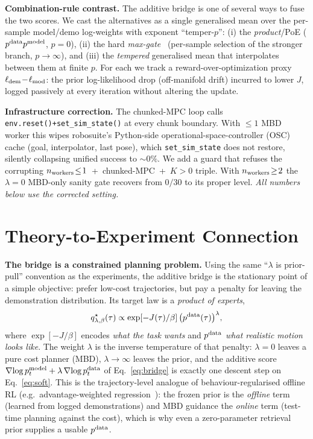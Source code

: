 \documentclass[letterpaper, 10 pt, conference]{ieeeconf}
\begin{document}
\textbf{Combination-rule contrast.} The additive bridge is one of several
ways to fuse the two scores. We cast the alternatives as a single
generalised mean over the per-sample model/demo log-weights with exponent
``temper-$p$'': (i) the \emph{product}/PoE
($p^{\rm data}p^{\rm model}$, $p\!=\!0$), (ii) the hard
\emph{max-gate}~\cite{mbd} (per-sample selection of the stronger branch,
$p\!\to\!\infty$), and (iii) the \emph{tempered} generalised mean that
interpolates between them at finite $p$. For each we track a
reward-over-optimization proxy $\ell_{\rm dem}\!-\!\ell_{\rm mod}$: the
prior log-likelihood drop (off-manifold drift) incurred to lower $J$,
logged passively at every iteration without altering the update.

\textbf{Infrastructure correction.} The chunked-MPC loop calls
\texttt{env.reset()+set\_sim\_state()} at every chunk boundary. With
$\le\!1$ MBD worker this wipes robosuite's Python-side operational-space-controller (OSC)
cache (goal, interpolator, last pose), which \texttt{set\_sim\_state}
does not restore, silently collapsing unified success to $\sim\!0\%$. We
add a guard that refuses the corrupting \mbox{$n_{\rm workers}\!\le\!1$ +
chunked-MPC + $K\!>\!0$} triple. With $n_{\rm workers}\!\ge\!2$ the
$\lambda\!=\!0$ MBD-only sanity gate recovers from $0/30$ to its proper
level. \emph{All numbers below use the corrected setting.}

\section{Theory-to-Experiment Connection}

\textbf{The bridge is a constrained planning problem.} Using the same
``$\lambda$ is prior-pull'' convention as the experiments, the additive
bridge is the stationary point of a simple objective: prefer low-cost
trajectories, but pay a penalty for leaving the demonstration
distribution. Its target law is a \emph{product of experts},
\begin{equation}
q^\star_{\lambda,\beta}(\tau)\propto
\exp[-J(\tau)/\beta]\,\big(p^{\rm data}(\tau)\big)^{\lambda},
\label{eq:soft}
\end{equation}
where $\exp[-J/\beta]$ encodes \emph{what the task wants} and
$p^{\rm data}$ \emph{what realistic motion looks like}. The weight
$\lambda$ is the inverse temperature of that penalty: $\lambda\!=\!0$
leaves a pure cost planner (MBD), $\lambda\!\to\!\infty$ leaves the prior,
and the additive score
$\nabla\!\log p^{\rm model}_t+\lambda\,\nabla\!\log p^{\rm data}_t$ of
Eq.~\ref{eq:bridge} is exactly one descent step on Eq.~\ref{eq:soft}.
This is the trajectory-level analogue of behaviour-regularised offline
RL (e.g.\ advantage-weighted regression~\cite{awr}): the frozen prior is the
\emph{offline} term (learned from logged demonstrations) and MBD guidance
the \emph{online} term (test-time planning against the cost), which is why
even a zero-parameter retrieval prior supplies a usable $p^{\rm data}$.
\end{document}
